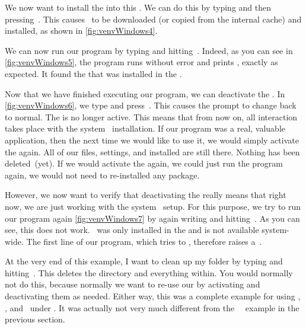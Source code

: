 We now want to install the \numpy{}  into this .
We can do this by typing  and then pressing~\keys{\return}.
This causes \numpy\ to be downloaded (or copied from the internal cache) and installed, as shown in \cref{fig:venvWindows4}.%
%
\begin{sloppypar}%
We can now run our program  by typing  and hitting~\keys{\return}.
Indeed, as you can see in \cref{fig:venvWindows5}, the program runs without error and prints , exactly as expected.
It found the \numpy{}  that was installed in the .%
\end{sloppypar}%
%
Now that we have finished executing our program, we can deactivate the .
In \cref{fig:venvWindows6}, we type  and press~\keys{\return}.
This causes the prompt to change back to normal.
The  is no longer active.
This means that from now on, all interaction takes place with the system \python\ installation.
If our program was a real, valuable application, then the next time we would like to use it, we would simply activate the  again.
All of our files, settings, and installed  are still there.
Nothing has been deleted~(yet).
If we would activate the  again, we could just run the program again, we would not need to re-installed any package.

However, we now want to verify that deactivating the  really means that right now, we are just working with the system \python\ setup.
For this purpose, we try to run our program again \cref{fig:venvWindows7} by again writing  and hitting~\keys{\return}.
As you can see, this does not work.
\numpy\ was only installed in the  and is not available system-wide.
The first line of our program, which tries to , therefore raises a~.

At the very end of this example, I want to clean up my folder by typing  and hitting~\keys{\return}.
This deletes the directory  and everything within.
You would normally not do this, because normally we want to re-use our  by activating and deactivating them as needed.
Either way, this was a complete example for using , \pip, and \venv\ under \microsoftWindows.
It was actually not very much different from the \ubuntu\ \linux\ example in the previous section.%
%
\endhsection%
%
\FloatBarrier
%
\endhsection%
%
